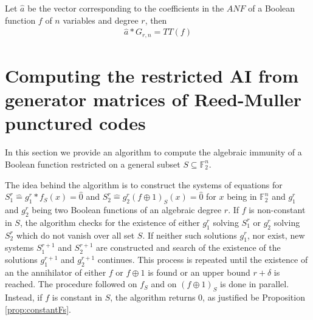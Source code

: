 \documentclass[11pt]{llncs}
\begin{document}
\begin{remark}
	Let $\hat{a}$ be the vector corresponding to the coefficients in the $ANF$ of a Boolean function $f$ of $n$ variables and degree $r$, then
	\begin{align*}
	\hat{a} * G_{r,n} = TT(f)
	\end{align*}
\end{remark}




















\section{Computing the restricted AI from generator matrices of Reed-Muller punctured codes}\label{sec:RMapproach}

In this section we provide an algorithm to compute the algebraic immunity of a Boolean function restricted on a general subset $S \subseteq \mathbb{F}_2^n$. 


The idea behind the algorithm is to construct the systems of equations for $S_1^r \hat{=}g_1^r*f_S (x)= \hat{0}$ and $S_2^r\hat{=}g_2^r (f\oplus 1)_S (x) = \hat{0}$ for $x$ being in $\mathbb{F}_2^n$ and $g_1^r$ and $g_2^r$ being two Boolean functions of an algebraic degree $r$.
If $f$ is non-constant in $S$, the algorithm checks for the existence of either $g_1^r$ solving $S_1^r$ or $g_2^r$ solving $S_2^r$ which do not vanish over all set $S$. If neither such solutions $g_1^r$, nor exist, new systems $S_1^{r+1}$ and $S_2^{r+1}$ are constructed and search of the existence of the solutions $g_{1}^{r+1}$ and $g_2^{r+1}$ continues. This process is repeated until the existence of an the annihilator of either $f$ or $f\oplus 1$ is found or an upper bound $r+\delta$ is reached. The procedure followed on $f_S$ and on $(f\oplus 1)_S$ is done in parallel.
Instead, if $f$ is constant in $S$, the algorithm returns $0$, as justified be Proposition \ref{prop:constantFs}.
\end{document}
